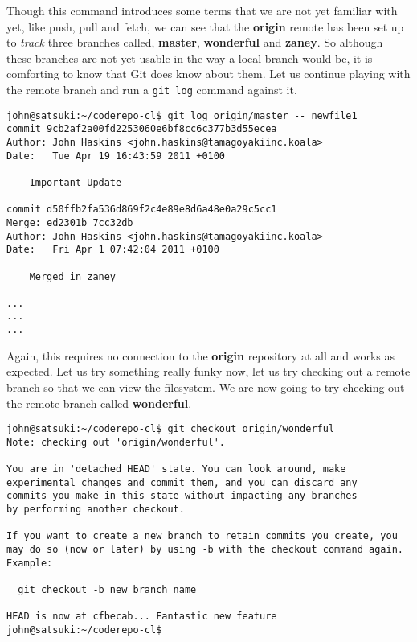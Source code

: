 Though this command introduces some terms that we are not yet familiar with yet, like push, pull and fetch, we can see that the \textbf{origin} remote has been set up to \emph{track} three branches called, \textbf{master}, \textbf{wonderful} and \textbf{zaney}.  So although these branches are not yet usable in the way a local branch would be, it is comforting to know that Git does know about them.  Let us continue playing with the remote branch and run a \texttt{git log} command against it.

\begin{Verbatim}[frame=leftline,framerule=1mm,fontsize=\relsize{-3}] 
john@satsuki:~/coderepo-cl$ git log origin/master -- newfile1
commit 9cb2af2a00fd2253060e6bf8cc6c377b3d55ecea
Author: John Haskins <john.haskins@tamagoyakiinc.koala>
Date:   Tue Apr 19 16:43:59 2011 +0100

    Important Update

commit d50ffb2fa536d869f2c4e89e8d6a48e0a29c5cc1
Merge: ed2301b 7cc32db
Author: John Haskins <john.haskins@tamagoyakiinc.koala>
Date:   Fri Apr 1 07:42:04 2011 +0100

    Merged in zaney

...
...
...
\end{Verbatim}

Again, this requires no connection to the \textbf{origin} repository at all and works as expected.  Let us try something really funky now, let us try checking out a remote branch so that we can view the filesystem.  We are now going to try checking out the remote branch called \textbf{wonderful}.

\begin{Verbatim}[frame=leftline,framerule=1mm,fontsize=\relsize{-3}] 
john@satsuki:~/coderepo-cl$ git checkout origin/wonderful
Note: checking out 'origin/wonderful'.

You are in 'detached HEAD' state. You can look around, make 
experimental changes and commit them, and you can discard any 
commits you make in this state without impacting any branches 
by performing another checkout.

If you want to create a new branch to retain commits you create, you 
may do so (now or later) by using -b with the checkout command again. 
Example:

  git checkout -b new_branch_name

HEAD is now at cfbecab... Fantastic new feature
john@satsuki:~/coderepo-cl$ 
\end{Verbatim}


